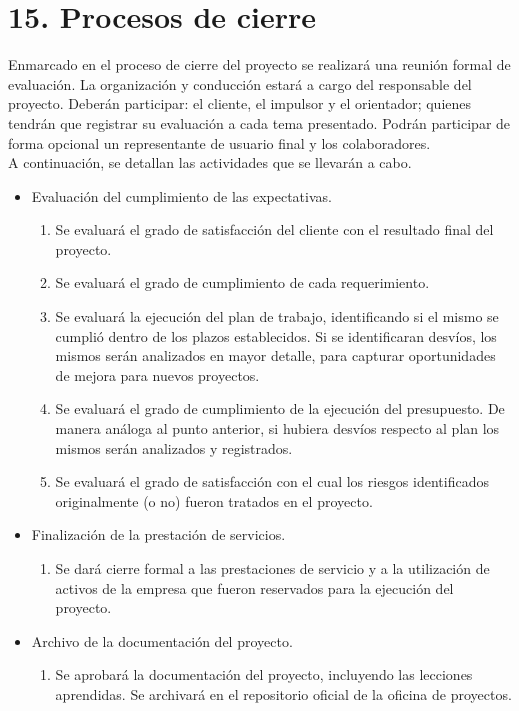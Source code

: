 \documentclass[
11pt, %
]{charter}
\begin{document}
\section{15. Procesos de cierre}    
\label{sec:cierre}


Enmarcado en el proceso de cierre del proyecto se realizará una reunión formal de evaluación. La organización y conducción estará a cargo del responsable del proyecto. Deberán participar: el cliente, el impulsor y el orientador; quienes tendrán que registrar su evaluación a cada tema presentado. Podrán participar de forma opcional un representante de usuario final y los colaboradores.\\
A continuación, se detallan las actividades que se llevarán a cabo.
\begin{itemize}
	\item Evaluación del cumplimiento de las expectativas.
	\begin{enumerate}
		\item Se evaluará el grado de satisfacción del cliente con el resultado final del proyecto.
		\item Se evaluará el grado de cumplimiento de cada requerimiento.
		\item Se evaluará la ejecución del plan de trabajo, identificando si el mismo se cumplió dentro de los plazos establecidos. Si se identificaran desvíos, los mismos serán analizados en mayor detalle, para capturar oportunidades de mejora para nuevos proyectos.
		\item Se evaluará el grado de cumplimiento de la ejecución del presupuesto.  De manera análoga al punto anterior, si hubiera desvíos respecto al plan los mismos serán analizados y registrados.
		\item Se evaluará el grado de satisfacción con el cual los riesgos identificados originalmente (o no) fueron tratados en el proyecto.
	\end{enumerate}
	
	\item Finalización de la prestación de servicios.
	\begin{enumerate}
		\item Se dará cierre formal a las prestaciones de servicio y a la utilización de activos de la empresa que fueron reservados para la ejecución del proyecto.
	\end{enumerate}

	\item Archivo de la documentación del proyecto.
	\begin{enumerate}
		\item Se aprobará la documentación del proyecto, incluyendo las lecciones aprendidas. Se archivará en el repositorio oficial de la oficina de proyectos.
	\end{enumerate}


\end{itemize}
\end{document}
